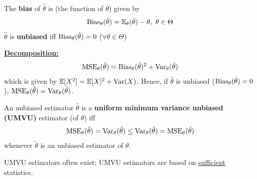 \documentclass[11pt]{elegantbook}
\begin{document}
\begin{definition}[Bias]
    \normalfont
    The \textbf{bias} of $\hat{\theta}$ is (the function of $\theta$) given by
    \begin{equation}
        \begin{aligned}
            \textnormal{Bias}_\theta(\hat{\theta})=\mathbb{E}_\theta(\hat{\theta})-\theta,\ \theta\in\Theta
        \end{aligned}
        \nonumber
    \end{equation}
    $\hat{\theta}$ is \textbf{unbiased} iff $\textnormal{Bias}_\theta(\hat{\theta})=0$ ($\forall \theta\in \Theta$)
\end{definition}
\textbf{\underline{Decomposition:}}
\begin{equation}
    \begin{aligned}
        \textnormal{MSE}_\theta(\hat{\theta})=\textnormal{Bias}_\theta(\hat{\theta})^2+\textnormal{Var}_\theta(\hat{\theta})
    \end{aligned}
    \nonumber
\end{equation}
which is given by $\mathbb{E}[X^2]=\mathbb{E}[X]^2+\textnormal{Var}(X)$. Hence, if $\hat{\theta}$ is unbiased ($\textnormal{Bias}_\theta(\hat{\theta})=0$), $\textnormal{MSE}_\theta(\hat{\theta})=\textnormal{Var}_\theta(\hat{\theta})$.

\begin{definition}[Optimality]
    \normalfont
    An unbiased estimator $\hat{\theta}$ is a \textbf{uniform minimum variance unbiased (UMVU)} estimator (of $\theta$) iff
    \begin{equation}
        \begin{aligned}
            \textnormal{MSE}_\theta(\hat{\theta})=\textnormal{Var}_\theta(\hat{\theta})\leq \textnormal{Var}_\theta(\tilde{\theta})=\textnormal{MSE}_\theta(\tilde{\theta})
        \end{aligned}
        \nonumber
    \end{equation}
    whenever $\tilde{\theta}$ is an unbiased estimator of $\theta$.
\end{definition}
\begin{remark}
    UMVU estimators often exist; UMVU estimators are based on \underline{sufficient} statistics.
\end{remark}
\end{document}
